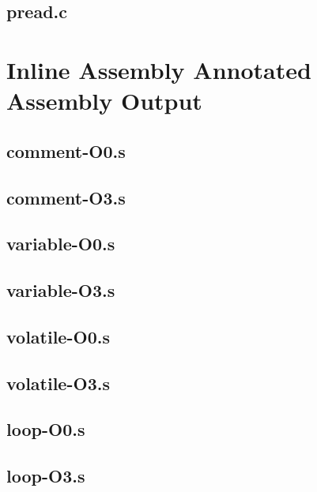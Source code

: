\begin{appendices}
\subsection{pread.c}


\section{Inline Assembly Annotated Assembly Output}
\label{app:inlineAnnotatedAssembly}
\lstset{language=[x64]Assembler}
\subsection{comment-O0.s}

\subsection{comment-O3.s}


\subsection{variable-O0.s}

\subsection{variable-O3.s}


\subsection{volatile-O0.s}

\subsection{volatile-O3.s}


\subsection{loop-O0.s}

\subsection{loop-O3.s}



\end{appendices}
